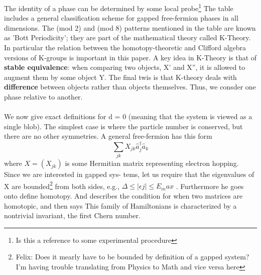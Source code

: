 The identity of a phase can be determined by some local probe\footnote{Is this a reference to some experimental procedure}
  The table includes a general classification scheme for gapped free-fermion phases in all dimensions. 
 The (mod 2) and (mod 8) patterns mentioned in the table are known as 'Bott Periodicity'; they are part of the 
 mathematical theory called K-Theory. 
    In particular the relation between the homotopy-theoretic and Clifford algebra versions of K-groups is important
    in this paper.
A key idea in K-Theory is that of \textbf{stable equivalence}:
when comparing two objects, X' and X'', it is allowed to augment them by some object Y. 
The final twis is that K-theory deals with \textbf{difference} between objects rather than objects themselves. Thus,
we consder one phase relative to another. 
 \paragraph{} We now give exact definitions for d = 0 (meaning
that the system is viewed as a single blob). The simplest
case is where the particle number is conserved, but there
are no other symmetries. A general free-fermion has this
form
\begin{equation*}
 \sum_{jk} X_{jk} \hat{a}_{j}^{\dag} \hat{a}_{k}
\end{equation*}
where $X = (X _{jk} )$ is some Hermitian matrix representing
electron hopping. Since we are interested in gapped sys-
tems, let us require that the eigenvalues of X are bounded\footnote{Felix: Does it mearly have to be bounded by 
definition of a gapped system? I'm having trouble translating from Physics to Math and vice versa here}
from both sides, e.g., $\Delta \leq |\epsilon j | \leq E_max$ . 
   Furthermore he goes onto define homotopy. And describes the condition for when two matrices are homotopic, and
   then says
   This family of
Hamiltonians is characterized by a nontrivial invariant, the first Chern number. 

